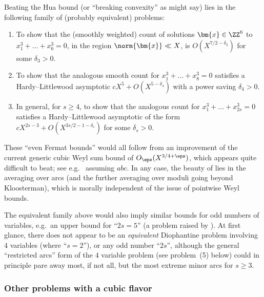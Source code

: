 \documentclass[12pt]{report}
\begin{document}
Beating the Hua bound
(or ``breaking convexity'' as \cite{wooley1995breaking} might say)
lies in the following family of (probably equivalent) problems:
\begin{enumerate}[(1)]
    \item To show that the (smoothly weighted) count of solutions $\bm{x}\in\ZZ^6$ to $x_1^3+\dots+x_6^3=0$,
    in the region $\norm{\bm{x}}\ll X$,
    is $O(X^{7/2-\delta_3})$ for some $\delta_3>0$.
    
    \item To show that the analogous smooth count for $x_1^3+\dots+x_8^3=0$ satisfies a Hardy--Littlewood asymptotic $cX^5 + O(X^{5-\delta_4})$ with a power saving $\delta_4>0$.
    
    \item In general,
    for $s\geq 4$,
    to show that the analogous count for $x_1^3+\dots+x_{2s}^3=0$ satisfies a Hardy--Littlewood asymptotic of the form $cX^{2s-3} + O(X^{3s/2-1-\delta_s})$ for some $\delta_s>0$.
\end{enumerate}
These ``even Fermat bounds'' would all follow from an improvement of the current generic cubic Weyl sum bound of $O_\eps(X^{3/4+\eps})$,
which appears quite difficult to beat;
see e.g.~\cite{heath2009bounds} assuming $abc$.
In any case,
the beauty of \cites{hooley1986HasseWeil, hooley_greaves_harman_huxley_1997,heath1998circle} lies in the averaging over arcs
(and the further averaging over moduli going beyond Kloosterman),
which is morally independent of the issue of pointwise Weyl bounds.

The equivalent family above would also imply similar bounds for odd numbers of variables,
e.g.~an upper bound for ``$2s=5$''
(a problem raised by \cite{bombieri2009problems}).
At first glance,
there does not appear to be an \emph{equivalent} Diophantine problem involving $4$ variables (where ``$s=2$''),
or any odd number ``$2s$'',
although the general ``restricted arcs'' form of the $4$ variable problem (see problem~(5) below) could in principle pare away
most, if not all, but the most extreme minor arcs for $s\geq 3$.

\subsubsection{Other problems with a cubic flavor}
\end{document}
